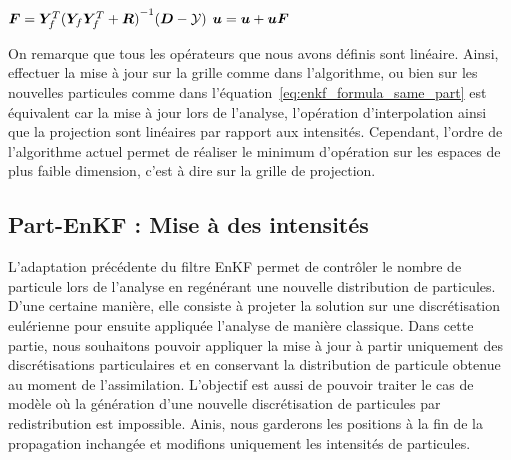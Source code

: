 \begin{itemize}
\begin{algorithm}

    $ \bm{F} = \bm Y_f^T {(\bm Y_f \bm Y_f^T + \bm R)}^{-1}(\bm{D} - \mathcal{Y})$ 
    $\bm u = \bm u + \bm u \bm{F}$ 
\end{algorithm}


On remarque que tous les opérateurs que nous avons définis sont linéaire. Ainsi, effectuer la mise à jour sur la grille comme dans l'algorithme, ou bien sur les nouvelles particules comme dans l'équation~\eqref{eq:enkf_formula_same_part} est équivalent car la mise à jour lors de l'analyse, l'opération d'interpolation ainsi que la projection sont linéaires par rapport aux intensités.
Cependant, l'ordre de l'algorithme actuel permet de réaliser le minimum d'opération sur les espaces de plus faible dimension, c'est à dire sur la grille de projection.

\subsection{Part-EnKF : Mise à des intensités}

L'adaptation précédente du filtre EnKF permet de contrôler le nombre de particule lors de l'analyse en regénérant une nouvelle distribution de particules. D'une certaine manière, elle consiste à projeter la solution sur une discrétisation eulérienne pour ensuite appliquée l'analyse de manière classique.
Dans cette partie, nous souhaitons pouvoir appliquer la mise à jour à partir uniquement des discrétisations particulaires et en conservant la distribution de particule obtenue au moment de l'assimilation. L'objectif est aussi de pouvoir traiter le cas de modèle où la génération d'une nouvelle discrétisation de particules par redistribution est impossible.
Ainis, nous garderons les positions à la fin de la propagation inchangée et modifions uniquement les intensités de particules.


\end{itemize}
